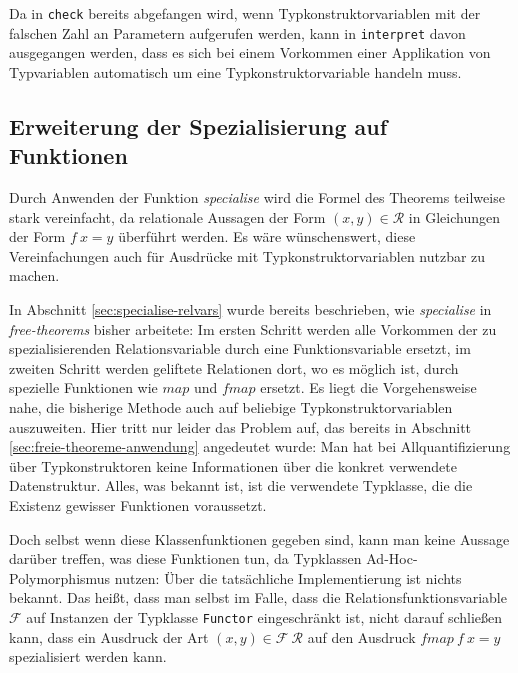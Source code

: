 Da in \texttt{check} bereits abgefangen wird, wenn Typkonstruktorvariablen mit der falschen Zahl an Parametern aufgerufen
werden, kann in \texttt{interpret} davon ausgegangen werden, dass es sich bei einem Vorkommen einer
Applikation von Typvariablen automatisch um eine Typkonstruktorvariable handeln muss.



\subsection{Erweiterung der Spezialisierung auf Funktionen}

Durch Anwenden der Funktion \textit{specialise} wird die Formel des Theorems teilweise stark vereinfacht, da relationale
Aussagen der Form $(x, y) \in \mathcal{R}$ in Gleichungen der Form $f\ x = y$ überführt werden. Es wäre wünschenswert,
diese Vereinfachungen auch für Ausdrücke mit Typkonstruktorvariablen nutzbar zu machen.

In Abschnitt \ref{sec:specialise-relvars} wurde bereits beschrieben, wie \textit{specialise} in \textit{free-theorems} bisher arbeitete:
Im ersten Schritt werden alle Vorkommen der zu spezialisierenden Relationsvariable durch eine Funktionsvariable ersetzt,
im zweiten Schritt werden geliftete Relationen dort, wo es möglich ist, durch spezielle Funktionen wie $map$ und $fmap$ ersetzt.
Es liegt die Vorgehensweise nahe, die bisherige Methode auch auf beliebige Typkonstruktorvariablen auszuweiten. Hier tritt nur leider
das Problem auf, das bereits in Abschnitt \ref{sec:freie-theoreme-anwendung} angedeutet wurde: Man hat bei Allquantifizierung
über Typkonstruktoren keine Informationen über die konkret verwendete
Datenstruktur. Alles, was bekannt ist, ist die verwendete Typklasse, die die Existenz gewisser Funktionen voraussetzt.

Doch selbst wenn diese Klassenfunktionen gegeben sind, kann man keine Aussage darüber treffen, was diese Funktionen tun, da
Typklassen Ad-Hoc-Polymorphismus nutzen: Über die tatsächliche Implementierung ist nichts bekannt. Das heißt, dass man selbst im Falle, dass
die Relationsfunktionsvariable $\mathcal{F}$ auf Instanzen der Typklasse \texttt{Functor} eingeschränkt ist, nicht darauf schließen kann, dass ein Ausdruck der Art $(x, y) \in \mathcal{F}\ \mathcal{R}$ auf den Ausdruck
$fmap\ f\ x = y$ spezialisiert werden kann.


